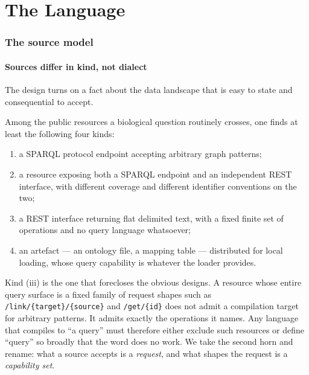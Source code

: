 \part{The Language}

\section{The source model}
\label{sec:model}

\subsection{Sources differ in kind, not dialect}

The design turns on a fact about the data landscape that is easy to state and
consequential to accept.

\begin{observation}
\label{obs:kind}
Among the public resources a biological question routinely crosses, one finds
at least the following four kinds:
\begin{enumerate}[label=(\roman*),leftmargin=2.6em]
\item a SPARQL protocol endpoint accepting arbitrary graph patterns;
\item a resource exposing both a SPARQL endpoint and an independent REST
interface, with different coverage and different identifier conventions on the
two;
\item a REST interface returning flat delimited text, with a fixed finite set
of operations and no query language whatsoever;
\item an artefact --- an ontology file, a mapping table --- distributed for
local loading, whose query capability is whatever the loader provides.
\end{enumerate}
\end{observation}

Kind (iii) is the one that forecloses the obvious designs. A resource whose
entire query surface is a fixed family of request shapes such as
\texttt{/link/\{target\}/\{source\}} and \texttt{/get/\{id\}} does not admit a
compilation target for arbitrary patterns. It admits exactly the operations it
names. Any language that compiles to ``a query'' must therefore either exclude
such resources or define ``query'' so broadly that the word does no work. We
take the second horn and rename: what a source accepts is a \emph{request}, and
what shapes the request is a \emph{capability set}.

